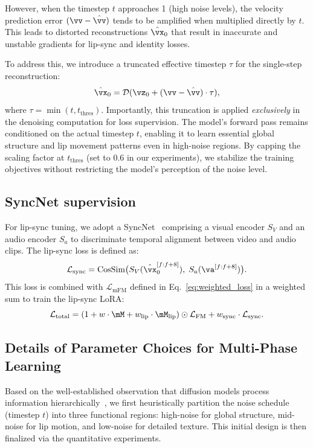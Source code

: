 However, when the timestep $t$ approaches 1 (high noise levels), the velocity prediction error $(\vv - \hat{\vv})$ tends to be amplified when multiplied directly by $t$. This leads to distorted reconstructions $\hat{\vx}_0$ that result in inaccurate and unstable gradients for lip-sync and identity losses. 

To address this, we introduce a truncated effective timestep $\tau$ for the single-step reconstruction:
\begin{equation}
\hat{\vx}_0 = \mathcal{D}(\vz_0 + (\vv - \hat{\vv}) \cdot \tau),
\end{equation}
where $\tau = \min(t, t_{\text{thres}})$. 
Importantly, this truncation is applied \emph{exclusively} in the denoising computation for loss supervision. The model's forward pass remains conditioned on the actual timestep $t$, enabling it to learn essential global structure and lip movement patterns even in high-noise regions. By capping the scaling factor at $t_{\text{thres}}$ (set to 0.6 in our experiments), we stabilize the training objectives without restricting the model's perception of the noise level.

\subsection{SyncNet supervision}
For lip-sync tuning, we adopt a SyncNet~\citep{chung2016syncnet} comprising a visual encoder $S_V$ and an audio encoder $S_a$ to discriminate temporal alignment between video and audio clips.  
The lip-sync loss is defined as:  
\begin{equation}
    \mathcal{L}_{\text{sync}} = 
    \text{CosSim}\big(S_V(\hat{\vx}_{0}^{[f:f+8]}), \; S_a(\va^{[f:f+8]})\big).
\end{equation}
This loss is combined with $\mathcal{L}_{\text{mFM}}$ defined in Eq.~\ref{eq:weighted_loss} in a weighted sum to train the lip-sync LoRA:
\begin{equation}
    \mathcal{L}_{\text{total}} = (1 + w \cdot \mM + w_{\text{lip}} \cdot \mM_{\text{lip}}) \odot \mathcal{L}_{\text{FM}} + w_{\text{sync}} \cdot \mathcal{L}_{\text{sync}}.
\end{equation}


\subsection{Details of Parameter Choices for Multi-Phase Learning}
\label{appendix_sec:multiphase_param}
Based on the well-established observation that diffusion models process information hierarchically~\cite{peng2025omnisync,zhang2025flexiact,meng2025echomimicv3}, we first heuristically partition the noise schedule (timestep $t$) into three functional regions: high-noise for global structure, mid-noise for lip motion, and low-noise for detailed texture. This initial design is then finalized via the quantitative experiments.


